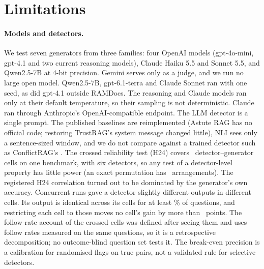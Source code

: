 \section*{Limitations}

\paragraph{Models and detectors.} We test seven generators from three families: four OpenAI models (gpt-4o-mini,
gpt-4.1 and two current reasoning models), Claude Haiku 5.5 and Sonnet 5.5, and Qwen2.5-7B at 4-bit precision. Gemini
serves only as a judge, and we run no large open model. Qwen2.5-7B, gpt-6.1-terra and Claude Sonnet ran with one seed,
as did gpt-4.1 outside RAMDocs. The reasoning and Claude models ran only at their default temperature, so their
sampling is not deterministic. Claude ran through Anthropic's OpenAI-compatible endpoint. The LLM detector is a single
prompt. The published baselines are reimplemented (Astute RAG has no official code; restoring TrustRAG's system message
changed little), NLI sees only a sentence-sized window, and we do not compare against a trained detector such as
ConflictRAG's \citep{wang2026conflictrag}. The crossed reliability test (H24) covers \hTwentyFourCells\
detector--generator cells on one benchmark, with six detectors, so any test of a detector-level property has little
power (an exact permutation has \hRedoNPerm\ arrangements). The registered H24 correlation turned out to be dominated by the
generator's own accuracy. Concurrent runs gave a detector slightly different outputs in different cells. Its output is
identical across its cells for at least \frozenShareMin\% of questions, and restricting each cell to those moves no
cell's gain by more than \frozenMaxShift\ points. The follow-rate account of the crossed cells was defined after seeing
them and uses follow rates measured on the same questions, so it is a retrospective decomposition; no outcome-blind
question set tests it. The break-even precision is a calibration for randomised flags on true pairs, not a validated
rule for selective detectors.

